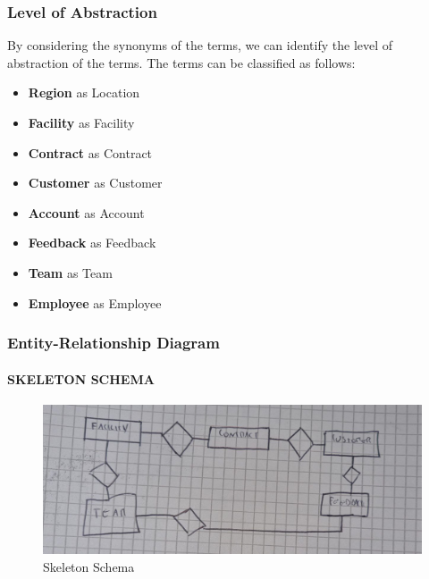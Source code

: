     \subsubsection{Level of Abstraction}
    By considering the synonyms of the terms, we can identify the level of abstraction of the terms. The terms can be classified as follows:
    \begin{itemize}
        \item \textbf{Region} as Location
        \item \textbf{Facility} as Facility
        \item \textbf{Contract} as Contract
        \item \textbf{Customer} as Customer
        \item \textbf{Account} as Account
        \item \textbf{Feedback} as Feedback
        \item \textbf{Team} as Team
        \item \textbf{Employee} as Employee
    \end{itemize}



\subsubsection{Entity-Relationship Diagram}

\paragraph{SKELETON SCHEMA} \leavevmode \newline
\begin{figure}[H]
    \centering
    \includegraphics[width=\textwidth]{images/SkeletonSchema.png}
    \caption{Skeleton Schema}
\end{figure}

